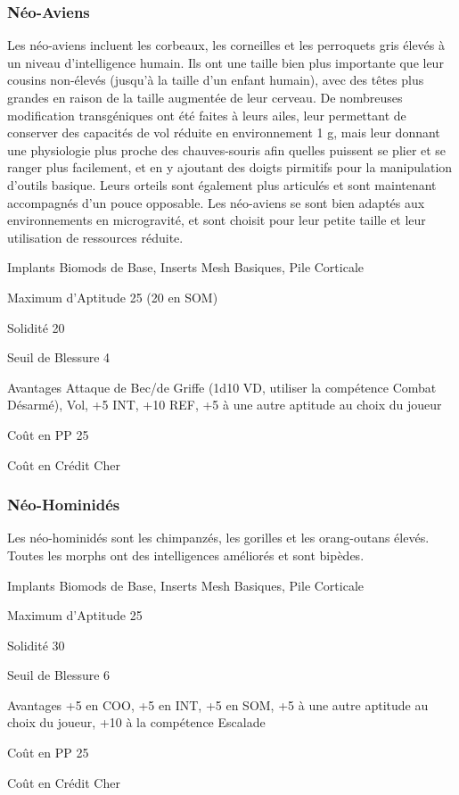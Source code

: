 \subsubsection{Néo-Aviens} \label{sec:starting-neo-avians} 

Les néo-aviens incluent les corbeaux, les corneilles et les perroquets gris élevés à un niveau d'intelligence humain. Ils ont une taille bien plus importante que leur cousins non-élevés (jusqu'à la taille d'un enfant humain), avec des têtes plus grandes en raison de la taille augmentée de leur cerveau. De nombreuses modification transgéniques ont été faites à leurs ailes, leur permettant de conserver des capacités de vol réduite en environnement 1 g, mais leur donnant une physiologie plus proche des chauves-souris afin quelles puissent se plier et se ranger plus facilement, et en y ajoutant des doigts pirmitifs pour la manipulation d'outils basique. Leurs orteils sont également plus articulés et sont maintenant accompagnés d'un pouce opposable. Les néo-aviens se sont bien adaptés aux environnements en microgravité, et sont choisit pour leur petite taille et leur utilisation de ressources réduite. 

\begin{description*} \item[Implants] Biomods de Base, Inserts Mesh Basiques, Pile Corticale\item[Maximum d'Aptitude] 25 (20 en SOM) \item[Solidité] 20 \item[Seuil de Blessure] 4 \item[Avantages] Attaque de Bec/de Griffe (1d10 VD, utiliser la compétence Combat Désarmé), Vol, +5 INT, +10 REF, +5 à une autre aptitude au choix du joueur\item[Coût en PP] 25 \item[Coût en Crédit] Cher \end{description*} 

\subsubsection{Néo-Hominidés} \label{sec:starting-neo-hominids} 

Les néo-hominidés sont les chimpanzés, les gorilles et les orang-outans élevés. Toutes les morphs ont des intelligences améliorés et sont bipèdes. 

\begin{description*} \item[Implants] Biomods de Base, Inserts Mesh Basiques, Pile Corticale\item[Maximum d'Aptitude] 25 \item[Solidité] 30 \item[Seuil de Blessure] 6 \item[Avantages] +5 en COO, +5 en INT, +5 en SOM, +5 à une autre aptitude au choix du joueur, +10 à la compétence Escalade\item[Coût en PP] 25 \item[Coût en Crédit] Cher \end{description*} 

